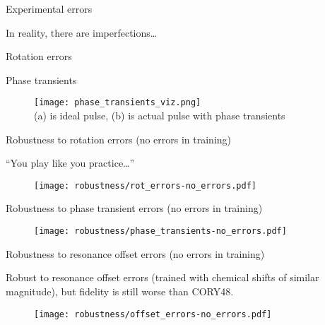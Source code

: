 \documentclass{beamer}
\begin{document}
\begin{frame}{Experimental errors}

In reality, there are imperfections\dots

Rotation errors

\begin{figure}
    \centering
    \scalebox{.6}{
    
    }
\end{figure}

Phase transients

\begin{figure}
    \centering
    \texttt{[image: phase\_transients\_viz.png]} \\
    (a) is ideal pulse, (b) is actual pulse with phase transients
\end{figure}



\end{frame}


\begin{frame}
{Robustness to rotation errors (no errors in training)}

``You play like you practice\dots''

\begin{figure}
    \centering
    \texttt{[image: robustness/rot\_errors-no\_errors.pdf]}
\end{figure}


\end{frame}

\begin{frame}{Robustness to phase transient errors  (no errors in training)}

\begin{figure}
    \centering
    \texttt{[image: robustness/phase\_transients-no\_errors.pdf]}
\end{figure}

\end{frame}

\begin{frame}{Robustness to resonance offset errors  (no errors in training)}

Robust to resonance offset errors (trained with chemical shifts of similar magnitude), but fidelity is still worse than CORY48.

\begin{figure}
    \centering
    \texttt{[image: robustness/offset\_errors-no\_errors.pdf]}
\end{figure}

\end{frame}
\end{document}
